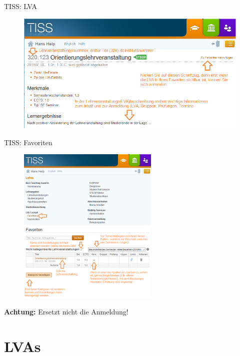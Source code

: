 \documentclass{beamer}
\begin{document}
\begin{frame}{TISS: LVA}
    \begin{figure}[htp]
        \centering
        \includegraphics[width=1\textwidth]{tiss_lva.png}
    \end{figure}
\end{frame}

\begin{frame}{TISS: Favoriten}
    \begin{figure}[htp]
        \centering
        \includegraphics[width=0.6\textwidth]{tiss_favoriten.png}
    \end{figure}
    \centering \textbf{Achtung:} Ersetzt nicht die Anmeldung!
\end{frame}

\section{LVAs}
\end{document}
